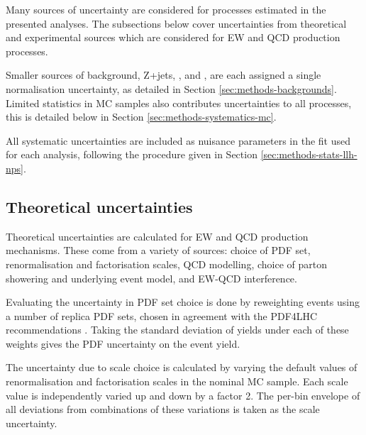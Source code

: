 
Many sources of uncertainty are considered for processes estimated in the
presented analyses. The subsections below cover uncertainties from theoretical
and experimental sources which are considered for \ac{EW} and \ac{QCD} \Zyjj
production processes.

Smaller sources of background, Z+jets, \tty, and \WZjj, are each assigned a
single normalisation uncertainty, as detailed in Section
\ref{sec:methods-backgrounds}.
Limited statistics in \ac{MC} samples also contributes uncertainties to all
processes, this is detailed below in Section \ref{sec:methods-systematics-mc}.

All systematic uncertainties are included as nuisance parameters in the fit used
for each analysis, following the procedure given in Section
\ref{sec:methods-stats-llh-nps}.

\subsection{Theoretical uncertainties}
\label{sec:methods-systematics-theory}

Theoretical uncertainties are calculated for \ac{EW} and \ac{QCD} \Zyjj production
mechanisms. These come from a variety of sources: choice of \ac{PDF} set,
renormalisation and factorisation scales, \ac{QCD} modelling, choice of parton
showering and underlying event model, and \ac{EW}-\ac{QCD} interference.

Evaluating the uncertainty in \ac{PDF} set choice is done by reweighting events
using a number of replica \ac{PDF} sets, chosen in agreement with the PDF4LHC
recommendations \cite{Butterworth2016}. Taking the standard deviation of yields
under each of these weights gives the \ac{PDF} uncertainty on the event yield. 

The uncertainty due to scale choice is calculated by varying the default values of
renormalisation and factorisation scales in the nominal \QCDZy \ac{MC} sample.
Each scale value is independently varied up and down by a factor 2.
The per-bin envelope of all deviations from combinations of these variations
is taken as the scale uncertainty.

